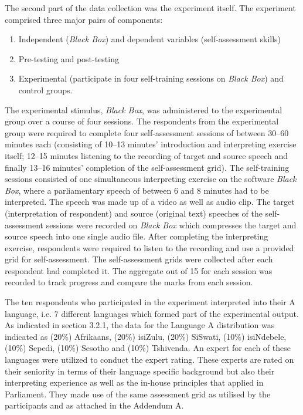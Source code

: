 \documentclass[output=paper]{langsci/langscibook}
\begin{document}
The second part of the data collection was the experiment itself. The experiment comprised three major pairs of components: 

\begin{enumerate}
\item Independent (\textit{Black Box}) and dependent variables (self-assessment skills) 
\item Pre-testing and post-testing 
\item Experimental (participate in four self-training sessions on \textit{Black Box}) and control groups. 
\end{enumerate}

The experimental stimulus, \textit{Black Box}, was administered to the experimental group over a course of four sessions. The respondents from the experimental group were required to complete four self-assessment sessions of between 30--60 minutes each (consisting of 10--13 minutes’ introduction and interpreting exercise itself; 12--15 minutes listening to the recording of target and source speech and finally 13--16 minutes’ completion of the self-assessment grid). The self-training sessions consisted of one simultaneous interpreting exercise on the software \textit{Black Box}, where a parliamentary speech of between 6 and 8 minutes had to be interpreted. The speech was made up of a video as well as audio clip. The target (interpretation of respondent) and source (original text) speeches of the self-assessment sessions were recorded on \textit{Black Box} which compresses the target and source speech into one single audio file. After completing the interpreting exercise, respondents were required to listen to the recording and use a provided grid for self-assessment. The self-assessment grids were collected after each respondent had completed it. The aggregate out of 15 for each session was recorded to track progress and compare the marks from each session. 

The ten respondents who participated in the experiment interpreted into their A language, i.e. 7 different languages which formed part of the experimental output. As indicated in section 3.2.1, the data for the Language A distribution was indicated as (20\%) Afrikaans, (20\%) isiZulu, (20\%) SiSwati, (10\%) isiNdebele, (10\%) Sepedi, (10\%) Sesotho and (10\%) Tshivenda. An expert for each of these languages were utilized to conduct the expert rating. These experts are rated on their seniority in terms of their language specific background but also their interpreting experience as well as the in-house principles that applied in Parliament. They made use of the same assessment grid as utilised by the participants and as attached in the Addendum A.
\end{document}
